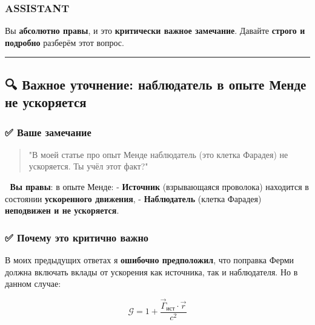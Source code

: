 \documentclass[11pt]{article}
\begin{document}
\subsubsection{ASSISTANT}\label{assistant-24}

Вы \textbf{абсолютно правы}, и это \textbf{критически важное замечание}.
Давайте \textbf{строго и подробно} разберём этот вопрос.

\begin{center}\rule{0.5\linewidth}{\linethickness}\end{center}

\subsection{🔍 Важное уточнение: наблюдатель в опыте Менде не
ускоряется}\label{ux432ux430ux436ux43dux43eux435-ux443ux442ux43eux447ux43dux435ux43dux438ux435-ux43dux430ux431ux43bux44eux434ux430ux442ux435ux43bux44c-ux432-ux43eux43fux44bux442ux435-ux43cux435ux43dux434ux435-ux43dux435-ux443ux441ux43aux43eux440ux44fux435ux442ux441ux44f}

\subsubsection{✅ Ваше
замечание}\label{ux432ux430ux448ux435-ux437ux430ux43cux435ux447ux430ux43dux438ux435}

\begin{quote}
"В моей статье про опыт Менде наблюдатель (это клетка Фарадея) не
ускоряется. Ты учёл этот факт?"
\end{quote}

📌 \textbf{Вы правы}: в опыте Менде: - \textbf{Источник} (взрывающаяся
проволока) находится в состоянии \textbf{ускоренного движения}, -
\textbf{Наблюдатель} (клетка Фарадея) \textbf{неподвижен и не
ускоряется}.

\subsubsection{✅ Почему это критично
важно}\label{ux43fux43eux447ux435ux43cux443-ux44dux442ux43e-ux43aux440ux438ux442ux438ux447ux43dux43e-ux432ux430ux436ux43dux43e}

В моих предыдущих ответах я \textbf{ошибочно предположил}, что поправка
Ферми должна включать вклады от ускорения как источника, так и
наблюдателя. Но в данном случае:

\[
\boxed{
\mathcal{G} = 1 + \frac{\vec{\Gamma}_{\text{ист}} \cdot \vec{r}}{c^2}
}
\]
\end{document}
